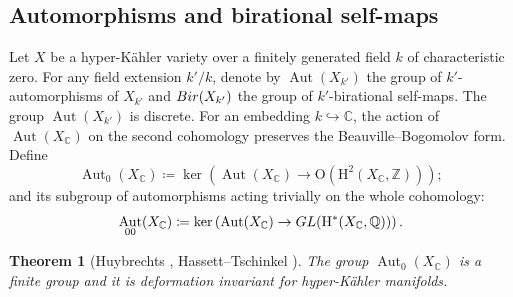 \documentclass[11pt,reqno,oneside]{amsart}
\numberwithin{equation}{section}
\newtheorem{theorem}{Theorem}[section]
\theoremstyle{definition}
\DeclareMathOperator{\Aut}{Aut}
\newcommand{\GL}{{\rm GL}}
\newcommand{\Bir}{{\rm Bir}}
\newcommand\rH{\mathrm{H}}
\newcommand{\CC}{\mathbb{C}}
\newcommand{\QQ}{\mathbb{Q}}
\newcommand{\ZZ}{\mathbb{Z}}
\begin{document}
\subsection{Automorphisms and birational self-maps}\label{subsect:AutBir}
Let $X$ be a hyper-Kähler variety over a finitely generated field $k$ of characteristic zero.  For any field extension $k'/k$, denote by $\Aut(X_{k'})$ the group of $k'$-automorphisms of $X_{k'}$  and $\Bir(X_{k'})$ the group of $k'$-birational self-maps. The group $\Aut(X_{k'})$ is discrete.
For an embedding $k\hookrightarrow \CC$, the action of $\Aut(X_{\CC})$ on the second cohomology preserves the Beauville--Bogomolov form. Define 
\begin{equation}
    \Aut_0(X_\CC)\coloneqq\ker\left(\Aut(X_\CC)\to \mathrm{O}(\rH^2(X_\CC,\ZZ))\right);
\end{equation}
and its subgroup of automorphisms acting trivially on the whole cohomology:
\begin{equation}
    \Aut_{00}(X_\CC)\coloneqq \ker\left(\Aut(X_\CC)\to \GL(\rH^*(X_\CC,\QQ))\right).
\end{equation}

\begin{theorem}[{Huybrechts \cite[Proposition 9.1]{MR1664696}, Hassett--Tschinkel \cite[Theorem 2.1]{HT13}}]
\label{thm:Aut0}
 The group $\Aut_0(X_\CC)$ is a finite group and it is deformation invariant for hyper-Kähler manifolds.
\end{theorem}
\end{document}
